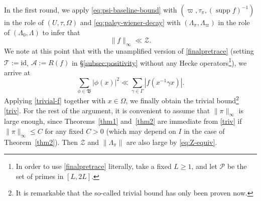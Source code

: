 \documentclass[11pt,oneside]{amsart}
\numberwithin{equation}{section}
\theoremstyle{remark}
\theoremstyle{plain}
\DeclareMathOperator{\supp}{supp}
\newcommand\id{\mathrm{id}}
\newcommand{\mcA}{\mathcal{A}}
\newcommand{\mcP}{\mathcal{P}}
\newcommand{\mcT}{\mathcal{T}}
\newcommand{\mcZ}{\mathcal{Z}}
\newcommand\mfB{\mathfrak{B}}
\renewcommand\leq{\leqslant}
\renewcommand\geq{\geqslant}
\begin{document}
In the first round, we apply \eqref{eq:psi-baseline-bound} with $(\varpi,\tau_\pi,(\supp f)^{-1})$ in the role of $(U,\tau,\Omega)$ and \eqref{eq:paley-wiener-decay} with $(\Lambda_\pi,\Lambda_\varpi)$ in the role of $(\Lambda_0,\Lambda)$ to infer that
\begin{equation}\label{trivial-f}
\| f \|_{\infty} \ll \mcZ.
\end{equation}
We note at this point that with the unamplified version of \eqref{finalpretrace} (setting $\mcT:=\id$, $\mcA:=R(f)$ in \S\ref{subsec:positivity} without any Hecke operators\footnote{In order to use \eqref{finalpretrace} literally, take a fixed $L\geq 1$, and let $\mcP$ be the set of primes in $[L,2L]$.}), we arrive at
\[
\sum_{\phi \in \mfB} | \phi(x)|^2 \ll \sum_{\gamma\in \Gamma} |f(x^{-1}\gamma x)|.
\]
Applying \eqref{trivial-f} together with $x\in\Omega$, we finally obtain the trivial bound\footnote{It is remarkable that the so-called trivial bound has only been proven now.} \eqref{triv}.
For the rest of the argument, it is convenient to assume that $\|\pi\|_{\infty}$ is large enough, since Theorems~\ref{thm1} and~\ref{thm2} are immediate from \eqref{triv} if $\|\pi\|_{\infty}\leq C$ for any fixed $C>0$ (which may depend on $I$ in the case of Theorem~\ref{thm2}). Then $\mcZ$ and $\|\Lambda_{\pi}\|$ are also large by \eqref{eq:Z-equiv}.
\end{document}
